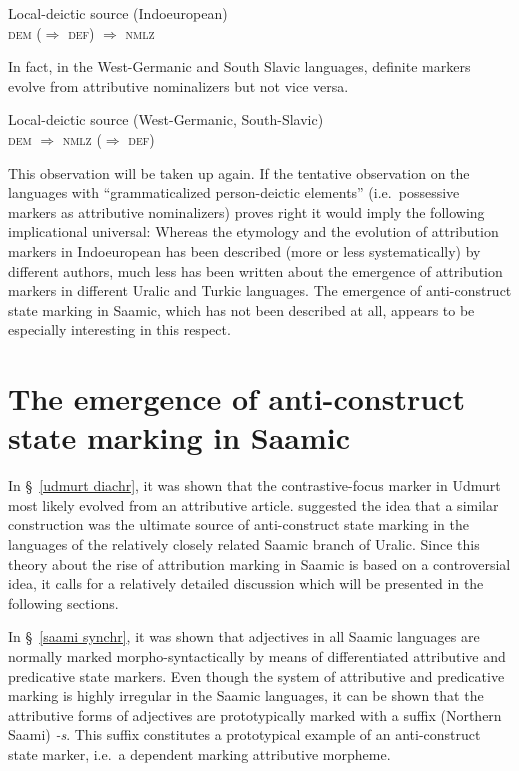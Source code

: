 {\begin{exe}
\ex Local-deictic source (Indoeuropean)\\
	\textsc{dem ($\Rightarrow$ def) $\Rightarrow$ nmlz}
\end{exe}
In fact, in the West-Germanic and South Slavic languages, definite markers evolve from attributive nominalizers but not vice versa. 
\begin{exe}
\ex Local-deictic source (West-Germanic, South-Slavic)\\
	\textsc{dem $\Rightarrow$ nmlz ($\Rightarrow$ def)}
\end{exe}
This observation will be taken up again. If the tentative observation on the languages with “grammaticalized person-deictic elements” (i.e.~possessive markers as attributive nominalizers) proves right it would imply the following implicational universal:
Whereas the etymology and the evolution of attribution markers in Indoeuropean has been described (more or less systematically) by different authors, much less has been written about the emergence of attribution markers in different Uralic and Turkic languages. The emergence of anti-construct state marking in Saamic, which has not been described at all, appears to be especially interesting in this respect.

\section[Anti-construct state in Saamic]{The emergence of anti-construct state marking in Saamic} \label{saamic diachr}
In \S~\ref{udmurt diachr}, it was shown that the contrastive-focus marker in Udmurt most likely evolved from an attributive article. \cite{riesler2006b} suggested the idea that a similar construction was the ultimate source of anti-construct state marking in the languages of the relatively closely related Saamic branch of Uralic. Since this theory about the rise of attribution marking in Saamic is based on a controversial idea, it calls for a relatively detailed discussion which will be presented in the following sections.

In \S~\ref{saami synchr}, it was shown that adjectives in all Saamic languages are normally marked morpho-syntactically by means of differentiated attributive and predicative state markers. Even though the system of attributive and predicative marking is highly irregular in the Saamic languages, it can be shown that the attributive forms of adjectives are prototypically marked with a suffix (Northern Saami) \textit{-s}. This suffix constitutes a prototypical example of an anti-construct state marker, i.e.~a dependent marking attributive morpheme.

}
